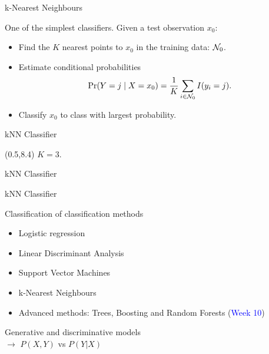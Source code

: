 \documentclass[14pt]{beamer}
\begin{document}
\begin{frame}{k-Nearest Neighbours}

One of the simplest classifiers. Given a test observation $x_0$:
\begin{itemize}
\item Find the $K$ nearest points to $x_0$ in the training data: ${\cal N}_0$.
\item Estimate conditional probabilities
$$\text{Pr}(Y=j \mid X=x_0) = \frac{1}{K}\sum_{i\in {\cal N}_0} I(y_i = j).$$
\item Classify $x_0$ to class with largest probability.
\end{itemize}
\end{frame}

\begin{frame}{kNN Classifier}
\begin{textblock}{10}(0.5,8.4)
$K=3$.
\end{textblock}
\end{frame}

\begin{frame}{kNN Classifier}
\end{frame}


\begin{frame}{kNN Classifier}
\end{frame}




\begin{frame}{\normalsize Classification of classification methods}\large


\begin{itemize}
		\item Logistic regression


	\item Linear Discriminant Analysis

	\item Support Vector Machines
	
	\item k-Nearest Neighbours

	\item Advanced methods: Trees, Boosting and Random Forests (\textcolor{blue}{Week 10})
\end{itemize}

\alert{Generative} and \alert{discriminative}  models \\
$\rightarrow$ $P(X, Y)$ vs $P(Y|X)$



\end{frame}
\end{document}
